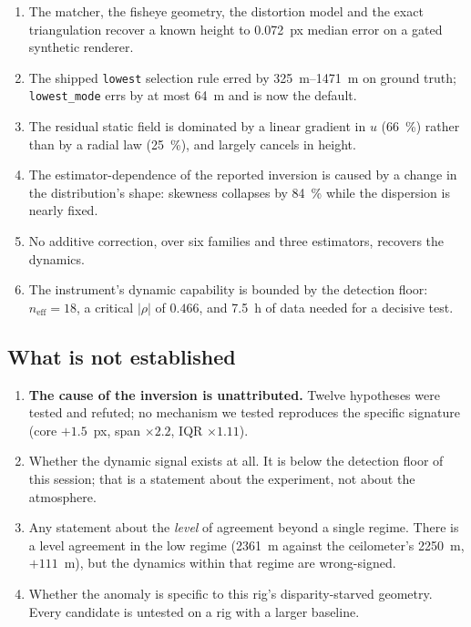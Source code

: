 \documentclass[11pt,a4paper]{article}
\newcommand{\neff}{\ensuremath{n_{\mathrm{eff}}}}
\newcommand{\rhoS}{\ensuremath{\rho}}
\begin{document}
\begin{enumerate}
\item The matcher, the fisheye geometry, the distortion model and the exact triangulation
recover a known height to \SI{0.072}{px} median error on a gated synthetic renderer.
\item The shipped \texttt{lowest} selection rule erred by \SIrange{325}{1471}{\metre} on
ground truth; \texttt{lowest\_mode} errs by at most \SI{64}{\metre} and is now the default.
\item The residual static field is dominated by a linear gradient in $u$ (\SI{66}{\percent})
rather than by a radial law (\SI{25}{\percent}), and largely cancels in height.
\item The estimator-dependence of the reported inversion is caused by a change in the
distribution's shape: skewness collapses by \SI{84}{\percent} while the dispersion is nearly
fixed.
\item No additive correction, over six families and three estimators, recovers the dynamics.
\item The instrument's dynamic capability is bounded by the detection floor: $\neff = 18$, a
critical $|\rhoS|$ of $0.466$, and \SI{7.5}{\hour} of data needed for a decisive test.
\end{enumerate}

\subsection{What is not established}

\begin{enumerate}
\item \textbf{The cause of the inversion is unattributed.} Twelve hypotheses were tested and
refuted; no mechanism we tested reproduces the specific signature (core $+1.5$~px, span
$\times2.2$, IQR $\times1.11$).
\item Whether the dynamic signal exists at all. It is below the detection floor of this
session; that is a statement about the experiment, not about the atmosphere.
\item Any statement about the \emph{level} of agreement beyond a single regime. There is a
level agreement in the low regime (\SI{2361}{\metre} against the ceilometer's
\SI{2250}{\metre}, $+111$~m), but the dynamics within that regime are wrong-signed.
\item Whether the anomaly is specific to this rig's disparity-starved geometry. Every
candidate is untested on a rig with a larger baseline.
\end{enumerate}
\end{document}
